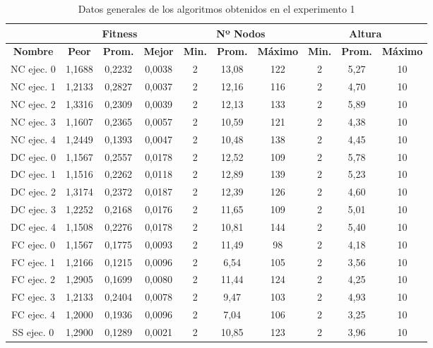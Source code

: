 \begin{table}[hbtp!]
\caption{Datos generales de los algoritmos obtenidos en el experimento 1}\label{tab:resumen_exp1}
\small
\centering
\begin{center}
\begin{tabular}{c|ccc|ccc|ccc}
\hline
{\textbf{}} & \multicolumn{3}{c}{{\textbf{Fitness}}} & \multicolumn{3}{c}{{\textbf{Nº Nodos}}} & \multicolumn{3}{c}{{\textbf{Altura}}} \\ \hline
{\textbf{Nombre}} & \textbf{Peor} &	\textbf{Prom.} & \textbf{Mejor} & \textbf{Min.} & \textbf{Prom.} & \textbf{Máximo} & \textbf{Min.} & \textbf{Prom.} & \textbf{Máximo} \\ \hline
NC ejec. 0 & 1,1688 & 0,2232 & 0,0038 & 2 & 13,08 & 122 & 2 & 5,27 & 10 \\
NC ejec. 1 & 1,2133 & 0,2827 & 0,0037 & 2 & 12,16 & 116 & 2 & 4,70 & 10 \\
NC ejec. 2 & 1,3316 & 0,2309 & 0,0039 & 2 & 12,13 & 133 & 2 & 5,89 & 10 \\
NC ejec. 3 & 1,1607 & 0,2365 & 0,0057 & 2 & 10,59 & 121 & 2 & 4,38 & 10 \\
NC ejec. 4 & 1,2449 & 0,1393 & 0,0047 & 2 & 10,48 & 138 & 2 & 4,45 & 10 \\ \hline
DC ejec. 0 & 1,1567 & 0,2557 & 0,0178 & 2 & 12,52 & 109 & 2 & 5,78 & 10 \\
DC ejec. 1 & 1,1516 & 0,2262 & 0,0118 & 2 & 12,89 & 139 & 2 & 5,23 & 10 \\
DC ejec. 2 & 1,3174 & 0,2372 & 0,0187 & 2 & 12,39 & 126 & 2 & 4,60 & 10 \\
DC ejec. 3 & 1,2252 & 0,2168 & 0,0176 & 2 & 11,65 & 109 & 2 & 5,01 & 10 \\
DC ejec. 4 & 1,1508 & 0,2276 & 0,0178 & 2 & 10,81 & 144 & 2 & 5,40 & 10 \\ \hline
FC ejec. 0 & 1,1567 & 0,1775 & 0,0093 & 2 & 11,49 & 98 & 2 & 4,18 & 10 \\
FC ejec. 1 & 1,2166 & 0,1215 & 0,0096 & 2 & 6,54 & 105 & 2 & 3,56 & 10 \\
FC ejec. 2 & 1,2905 & 0,1699 & 0,0080 & 2 & 11,44 & 124 & 2 & 4,25 & 10 \\
FC ejec. 3 & 1,2133 & 0,2404 & 0,0078 & 2 & 9,47 & 103 & 2 & 4,93 & 10 \\
FC ejec. 4 & 1,2000 & 0,1936 & 0,0096 & 2 & 7,04 & 106 & 2 & 3,25 & 10 \\ \hline
SS ejec. 0 & 1,2900 & 0,1289 & 0,0021 & 2 & 10,85 & 123 & 2 & 3,96 & 10 \\

\end{tabular}
\end{center}
\end{table}
